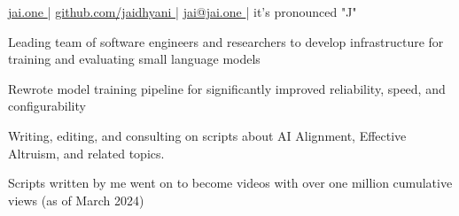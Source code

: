 \documentclass[]{resume}
\begin{document}
%
%
\lastupdated
\github

%
%
{ 
    \href{http://jai.one }{jai.one }|
    \href{http://github.com/jaidhyani}{ github.com/jaidhyani }|
    \href{mailto:jai@jai.one}{ jai@jai.one }|
    it's pronounced "J"
}

%
%



%
%


\hfill
\begin{minipage}[t]{1.0\textwidth}






\vspace{\topsep} %

\begin{tightemize}
    \item Leading team of software engineers and researchers to develop infrastructure for training and evaluating small language models
    \item Rewrote model training pipeline for significantly improved reliability, speed, and configurability
\end{tightemize}

\begin{tightemize}
    \item Writing, editing, and consulting on scripts about AI Alignment, Effective Altruism, and related topics.
    \columnbreak
    \item Scripts written by me went on to become videos with over one million cumulative views (as of March 2024)
\end{tightemize}


\end{minipage}
\end{document}
